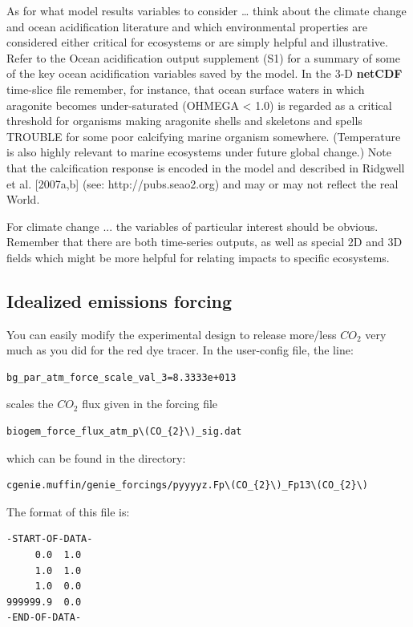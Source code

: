\documentclass[11pt,fleqn]{book} %
\begin{document}
As for what model results variables to consider … think about the climate change and ocean acidification literature and which environmental properties are considered either critical for ecosystems or are simply helpful and illustrative. Refer to the Ocean acidification output supplement (S1) for a summary of some of the key ocean acidification variables saved by the model. 
In the 3-D \textbf{netCDF} time-slice file remember, for instance, that ocean surface waters in which aragonite becomes under-saturated (OHMEGA < 1.0) is regarded as a critical threshold for organisms making aragonite shells and skeletons and spells TROUBLE for some poor calcifying marine organism somewhere. (Temperature is also highly relevant to marine ecosystems under future global change.) Note that the calcification response is encoded in the model and described in Ridgwell et al. [2007a,b] (see: http://pubs.seao2.org) and may or may not reflect the real World.

For climate change ... the variables of particular interest should be obvious. Remember that there are both time-series outputs, as well as special 2D and 3D fields which might be more helpful for relating impacts to specific ecosystems.


\subsection{Idealized emissions forcing}

\noindent You can easily modify the experimental design to release more/less \(CO_{2}\) very much as you did for the red dye tracer. In the user-config file, the line:
\vspace{-2pt}\begin{verbatim}
bg_par_atm_force_scale_val_3=8.3333e+013
\end{verbatim}\vspace{-2pt}
scales the \(CO_{2}\) flux given in the forcing file 
\vspace{-2pt}\begin{verbatim}
biogem_force_flux_atm_p\(CO_{2}\)_sig.dat
\end{verbatim}\vspace{-2pt}
which can be found in the directory:
\vspace{-2pt}\begin{verbatim}
cgenie.muffin/genie_forcings/pyyyyz.Fp\(CO_{2}\)_Fp13\(CO_{2}\)
\end{verbatim}\vspace{-2pt}
The format of this file is:
\vspace{-2pt}\begin{verbatim}
-START-OF-DATA-
     0.0  1.0 
     1.0  1.0
     1.0  0.0
999999.9  0.0
-END-OF-DATA-
\end{verbatim}\vspace{-2pt}
\end{document}
